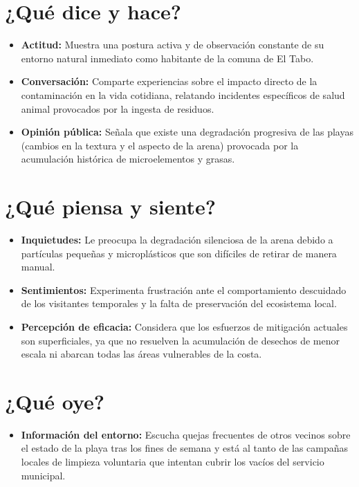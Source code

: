 \documentclass[12pt,letterpaper]{article}
\begin{document}
\section*{¿Qué dice y hace?}
\begin{itemize}[leftmargin=*]
	\item \textbf{Actitud:} Muestra una postura activa y de observación constante de su entorno natural inmediato como habitante de la comuna de El Tabo.
	\item \textbf{Conversación:} Comparte experiencias sobre el impacto directo de la contaminación en la vida cotidiana, relatando incidentes específicos de salud animal provocados por la ingesta de residuos.
	\item \textbf{Opinión pública:} Señala que existe una degradación progresiva de las playas (cambios en la textura y el aspecto de la arena) provocada por la acumulación histórica de microelementos y grasas.
\end{itemize}

\section*{¿Qué piensa y siente?}
\begin{itemize}[leftmargin=*]
	\item \textbf{Inquietudes:} Le preocupa la degradación silenciosa de la arena debido a partículas pequeñas y microplásticos que son difíciles de retirar de manera manual.
	\item \textbf{Sentimientos:} Experimenta frustración ante el comportamiento descuidado de los visitantes temporales y la falta de preservación del ecosistema local.
	\item \textbf{Percepción de eficacia:} Considera que los esfuerzos de mitigación actuales son superficiales, ya que no resuelven la acumulación de desechos de menor escala ni abarcan todas las áreas vulnerables de la costa.
\end{itemize}

\section*{¿Qué oye?}
\begin{itemize}[leftmargin=*]
	\item \textbf{Información del entorno:} Escucha quejas frecuentes de otros vecinos sobre el estado de la playa tras los fines de semana y está al tanto de las campañas locales de limpieza voluntaria que intentan cubrir los vacíos del servicio municipal.
\end{itemize}
\end{document}

